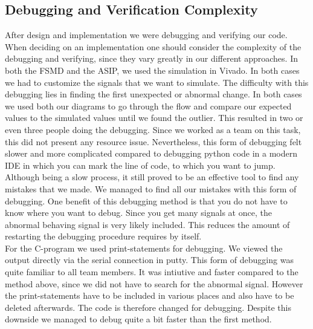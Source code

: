 \documentclass[conference]{IEEEtran}
\begin{document}
\subsection{Debugging and Verification Complexity} \label{sec:debugging}
After design and implementation we were debugging and verifying our code. When deciding on an implementation one should consider the complexity of the debugging and verifying, since they vary greatly in our different approaches. In both the FSMD and the ASIP, we used the simulation in Vivado. In both cases we had to customize the signals that we want to simulate. The difficulty with this debugging lies in finding the first unexpected or abnormal change. In both cases we used both our diagrams to go through the flow and compare our expected values to the simulated values until we found the outlier. This resulted in two or even three people doing the debugging. Since we worked as a team on this task, this did not present any resource issue. Nevertheless, this form of debugging felt slower and more complicated compared to debugging python code in a modern IDE in which you can mark the line of code, to which you want to jump. Although being a slow process, it still proved to be an effective tool to find any mistakes that we made. We managed to find all our mistakes with this form of debugging. One benefit of this debugging method is that you do not have to know where you want to debug. Since you get many signals at once, the abnormal behaving signal is very likely included. This reduces the amount of restarting the debugging procedure requires by itself. \\
For the C-program we used print-statements for debugging. We viewed the output directly via the serial connection in putty. This form of debugging was quite familiar to all team members. It was intiutive and faster compared to the method above, since we did not have to search for the abnormal signal. However the print-statements have to be included in various places and also have to be deleted afterwards. The code is therefore changed for debugging. Despite this downside we managed to debug quite a bit faster than the first method. \\
\end{document}

